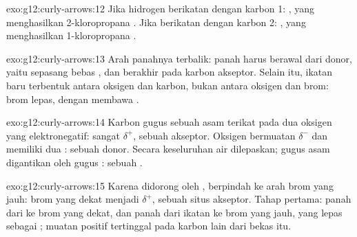 \begin{solution}{exo:g12:curly-arrows:12}
Jika hidrogen berikatan dengan karbon 1: , yang
menghasilkan 2-kloropropana . Jika berikatan dengan
karbon 2: , yang menghasilkan 1-kloropropana
.
\end{solution}

\begin{solution}{exo:g12:curly-arrows:13}
Arah panahnya terbalik: panah harus berawal dari donor, yaitu sepasang
 bebas , dan berakhir pada karbon akseptor. Selain itu,
ikatan baru terbentuk antara oksigen dan karbon, bukan antara oksigen
dan brom: brom lepas, dengan membawa 
.
\end{solution}

\begin{solution}{exo:g12:curly-arrows:14}
Karbon gugus  sebuah asam terikat pada dua  oksigen yang
elektronegatif: sangat $\delta^+$, sebuah akseptor. Oksigen 
bermuatan $\delta^-$ dan memiliki dua : sebuah
donor. Secara keseluruhan air dilepaskan; gugus  asam digantikan
oleh gugus  : sebuah .
\end{solution}

\begin{solution}{exo:g12:curly-arrows:15}
Karena didorong oleh  ,   berpindah ke arah brom yang jauh: brom yang dekat
menjadi $\delta^+$, sebuah situs akseptor. Tahap pertama: panah dari
 ke brom yang dekat, dan panah dari ikatan  ke
brom yang jauh, yang lepas sebagai ; muatan positif tertinggal
pada karbon lain dari bekas  itu.
\end{solution}

